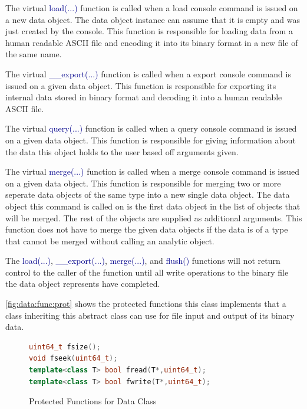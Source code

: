 \documentclass[10pt]{article}
\providecommand{\h}[1]{\textcolor{darkblue}{#1}}
\begin{document}
The virtual \h{load(...)} function is called when a load console command 
is issued on a new data object. The data object instance can assume that it is 
empty and was just created by the console. This function is responsible for 
loading data from a human readable ASCII file and encoding it into its binary 
format in a new file of the same name.

The virtual \h{\_\_export(...)} function is called when a export console command 
is issued on a given data object. This function is responsible for exporting 
its internal data stored in binary format and decoding it into a human readable 
ASCII file.

The virtual \h{query(...)} function is called when a query console command is 
issued on a given data object. This function is responsible for giving 
information about the data this object holds to the user based off arguments 
given.

The virtual \h{merge(...)} function is called when a merge console command is 
issued on a given data object. This function is responsible for merging two or 
more seperate data objects of the same type into a new single data object. The 
data object this command is called on is the first data object in the list of 
objects that will be merged. The rest of the objects are supplied as additional 
arguments. This function does not have to merge the given data objects if the 
data is of a type that cannot be merged without calling an analytic object.

The \h{load(...)}, \h{\_\_export(...)}, \h{merge(...)}, and \h{flush()} 
functions will not return control to the caller of the function until all write 
operations to the binary file the data object represents have completed.

\autoref{fig:data:func:prot} shows the protected functions this class 
implements that a class inheriting this abstract class can use for file input 
and output of its binary data.

\begin{figure}[H]
\begin{mdframed}[style=functions]
\begin{lstlisting}[language=C++]
uint64_t fsize();
void fseek(uint64_t);
template<class T> bool fread(T*,uint64_t);
template<class T> bool fwrite(T*,uint64_t);
\end{lstlisting}
\end{mdframed}
\caption{Protected Functions for Data Class}
\label{fig:data:func:prot}
\end{figure}
\end{document}
